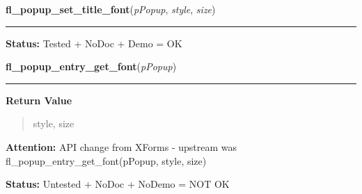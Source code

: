     \label{xformslib:library:fl_popup_set_title_font}

    \vspace{0.5ex}

\hspace{.8\funcindent}\begin{boxedminipage}{\funcwidth}

    \raggedright \textbf{fl\_popup\_set\_title\_font}(\textit{pPopup}, \textit{style}, \textit{size})

    \vspace{-1.5ex}

    \rule{\textwidth}{0.5\fboxrule}
\setlength{\parskip}{2ex}
\setlength{\parskip}{1ex}
\textbf{Status:} Tested + NoDoc + Demo = OK



    \end{boxedminipage}

    \label{xformslib:library:fl_popup_entry_get_font}

    \vspace{0.5ex}

\hspace{.8\funcindent}\begin{boxedminipage}{\funcwidth}

    \raggedright \textbf{fl\_popup\_entry\_get\_font}(\textit{pPopup})

    \vspace{-1.5ex}

    \rule{\textwidth}{0.5\fboxrule}
\setlength{\parskip}{2ex}
\setlength{\parskip}{1ex}
      \textbf{Return Value}
    \vspace{-1ex}

      \begin{quote}
      style, size

      \end{quote}

\textbf{Attention:} API change from XForms - upstream was fl\_popup\_entry\_get\_font(pPopup, 
style, size)



\textbf{Status:} Untested + NoDoc + NoDemo = NOT OK



    \end{boxedminipage}

